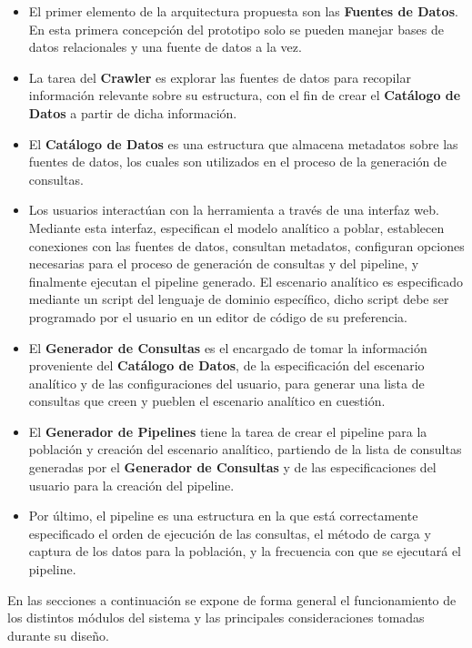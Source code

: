 \begin{itemize}
    \item El primer elemento de la arquitectura propuesta son las \textbf{Fuentes de Datos}. En esta primera concepción del 
        prototipo solo se pueden manejar bases de datos relacionales y una fuente de datos a la vez.
    \item La tarea del \textbf{Crawler} es explorar las fuentes de datos para recopilar información relevante sobre su estructura, 
        con el fin de crear el \textbf{Catálogo de Datos} a partir de dicha información.
    \item El \textbf{Catálogo de Datos} es una estructura que almacena metadatos sobre las fuentes de datos, los cuales son 
        utilizados en el proceso de la generación de consultas.
    \item Los usuarios interactúan con la herramienta a través de una interfaz web. Mediante esta interfaz, especifican el modelo 
        analítico a poblar, establecen conexiones con las fuentes de datos, consultan metadatos, configuran opciones necesarias 
        para el proceso de generación de consultas y del pipeline, y finalmente ejecutan el pipeline generado. El escenario analítico 
        es especificado mediante un script del lenguaje de dominio específico, dicho script debe ser programado por el usuario en 
        un editor de código de su preferencia.
    \item El \textbf{Generador de Consultas} es el encargado de tomar la información proveniente del \textbf{Catálogo de Datos}, de la especificación
        del escenario analítico y de las configuraciones del usuario, para generar una lista de consultas que creen y pueblen el escenario 
        analítico en cuestión.
    \item El \textbf{Generador de Pipelines} tiene la tarea de crear el pipeline para la población y creación del escenario analítico, partiendo 
        de la lista de consultas generadas por el \textbf{Generador de Consultas} y de las especificaciones del usuario para la creación del pipeline.
    \item Por \'ultimo, el pipeline es una estructura en la que est\'a correctamente especificado el orden de ejecución de las consultas, 
        el método de carga y captura de los datos para la población, y la frecuencia con que se ejecutar\'a el pipeline.
\end{itemize}

En las secciones a continuación se expone de forma general el funcionamiento de
los distintos módulos del sistema y las principales consideraciones tomadas durante
su diseño.

